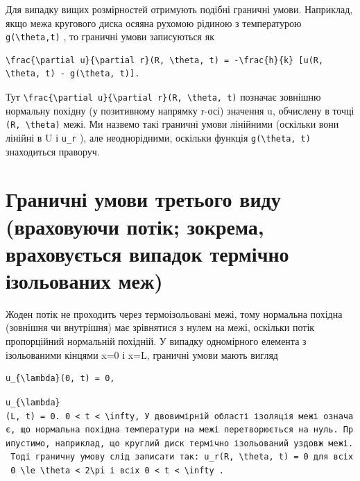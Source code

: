 \documentclass[
  ukrainian,
]{article}
\begin{document}
Для випадку вищих розмірностей отримують подібні граничні умови.
Наприклад, якщо межа кругового диска осяяна рухомою рідиною з
температурою \texttt{g(\textbackslash{}theta,t)} , то граничні умови
записуються як

\begin{verbatim}
\frac{\partial u}{\partial r}(R, \theta, t) = -\frac{h}{k} [u(R, \theta, t) - g(\theta, t)].
\end{verbatim}

Тут
\texttt{\textbackslash{}frac\{\textbackslash{}partial\ u\}\{\textbackslash{}partial\ r\}(R,\ \textbackslash{}theta,\ t)}
позначає зовнішню нормальну похідну (у позитивному напрямку r-осі)
значення u, обчислену в точці \texttt{(R,\ \textbackslash{}theta)} межі.
Ми назвемо такі граничні умови лінійними (оскільки вони лінійні в U і
\texttt{u\_r} ), але неоднорідними, оскільки функція
\texttt{g(\textbackslash{}theta,\ t)} знаходиться праворуч.

\section{Граничні умови третього виду (враховуючи потік; зокрема,
враховується випадок термічно ізольованих
меж)}\label{ux433ux440ux430ux43dux438ux447ux43dux456-ux443ux43cux43eux432ux438-ux442ux440ux435ux442ux44cux43eux433ux43e-ux432ux438ux434ux443-ux432ux440ux430ux445ux43eux432ux443ux44eux447ux438-ux43fux43eux442ux456ux43a-ux437ux43eux43aux440ux435ux43cux430-ux432ux440ux430ux445ux43eux432ux443ux454ux442ux44cux441ux44f-ux432ux438ux43fux430ux434ux43eux43a-ux442ux435ux440ux43cux456ux447ux43dux43e-ux456ux437ux43eux43bux44cux43eux432ux430ux43dux438ux445-ux43cux435ux436}

Жоден потік не проходить через термоізольовані межі, тому нормальна
похідна (зовнішня чи внутрішня) має зрівнятися з нулем на межі, оскільки
потік пропорційний нормальній похідній. У випадку одномірного елемента з
ізольованими кінцями x=0 і x=L, граничні умови мають вигляд

\begin{verbatim}
u_{\lambda}(0, t) = 0,
\end{verbatim}

\texttt{\textquotesingle{}u\_\{\textbackslash{}lambda\}(L,\ t)\ =\ 0.\textquotesingle{}\ \textquotesingle{}0\ \textless{}\ t\ \textless{}\ \textbackslash{}infty,\textquotesingle{}\ У\ двовимірній\ області\ ізоляція\ межі\ означає,\ що\ нормальна\ похідна\ температури\ на\ межі\ перетворюється\ на\ нуль.\ Припустимо,\ наприклад,\ що\ круглий\ диск\ термічно\ ізольований\ уздовж\ межі.\ Тоді\ граничну\ умову\ слід\ записати\ так:\ \textquotesingle{}u\_r(R,\ \textbackslash{}theta,\ t)\ =\ 0\textquotesingle{}\ для\ всіх\ \textquotesingle{}0\ \textbackslash{}le\ \textbackslash{}theta\ \textless{}\ 2\textbackslash{}pi\textquotesingle{}\ і\ всіх\ \textquotesingle{}0\ \textless{}\ t\ \textless{}\ \textbackslash{}infty\textquotesingle{}\ .}
\end{document}
